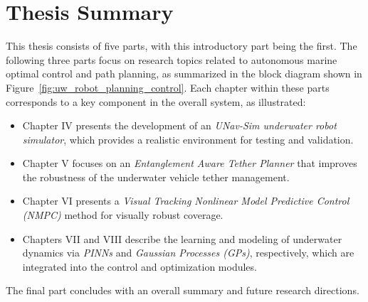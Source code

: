 \chapter{Thesis Summary}


This thesis consists of five parts, with this introductory part being the first. The following three parts focus on research topics related to autonomous marine optimal control and path planning, as summarized in the block diagram shown in Figure~\ref{fig:uw_robot_planning_control}. Each chapter within these parts corresponds to a key component in the overall system, as illustrated:

\begin{itemize}
  \item Chapter IV presents the development of an \textit{UNav-Sim underwater robot simulator}, which provides a realistic environment for testing and validation.
  \item Chapter V focuses on an \textit{Entanglement Aware Tether Planner} that improves the robustness of the underwater vehicle tether management.
  \item Chapter VI presents a \textit{Visual Tracking Nonlinear Model Predictive Control (NMPC)} method for visually robust coverage.
  \item Chapters VII and VIII describe the learning and modeling of underwater dynamics via \textit{PINNs} and \textit{Gaussian Processes (GPs)}, respectively, which are integrated into the control and optimization modules.
\end{itemize}

The final part concludes with an overall summary and future research directions.

